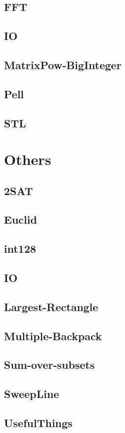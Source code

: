 \documentclass{article}
\begin{document}
\subsection{FFT}

\subsection{IO}

\subsection{MatrixPow-BigInteger}

\subsection{Pell}

\subsection{STL}

\section{Others}
\subsection{2SAT}

\subsection{Euclid}

\subsection{int128}

\subsection{IO}

\subsection{Largest-Rectangle}

\subsection{Multiple-Backpack}

\subsection{Sum-over-subsets}

\subsection{SweepLine}

\subsection{UsefulThings}

\end{document}
